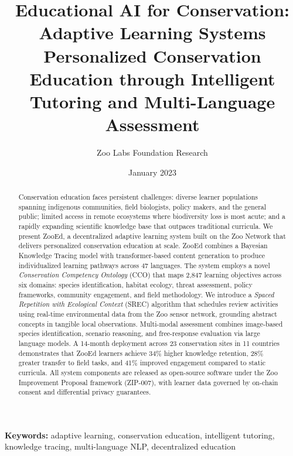 \documentclass[11pt,a4paper]{article}
\title{\textbf{Educational AI for Conservation: Adaptive Learning Systems} \\[0.5em]
\large Personalized Conservation Education through Intelligent Tutoring and Multi-Language Assessment}
\author[1]{Zoo Labs Foundation Research}
\affil[1]{Zoo Labs Foundation Research, Research Division \\ \texttt{research@zoo.ngo}}
\date{January 2023}
\begin{document}
\zoocoverpage

\begin{abstract}
\noindent
Conservation education faces persistent challenges: diverse learner populations spanning indigenous communities, field biologists, policy makers, and the general public; limited access in remote ecosystems where biodiversity loss is most acute; and a rapidly expanding scientific knowledge base that outpaces traditional curricula.
We present ZooEd, a decentralized adaptive learning system built on the Zoo Network that delivers personalized conservation education at scale.
ZooEd combines a Bayesian Knowledge Tracing model with transformer-based content generation to produce individualized learning pathways across 47 languages.
The system employs a novel \emph{Conservation Competency Ontology} (CCO) that maps 2,847 learning objectives across six domains: species identification, habitat ecology, threat assessment, policy frameworks, community engagement, and field methodology.
We introduce a \emph{Spaced Repetition with Ecological Context} (SREC) algorithm that schedules review activities using real-time environmental data from the Zoo sensor network, grounding abstract concepts in tangible local observations.
Multi-modal assessment combines image-based species identification, scenario reasoning, and free-response evaluation via large language models.
A 14-month deployment across 23 conservation sites in 11 countries demonstrates that ZooEd learners achieve 34\% higher knowledge retention, 28\% greater transfer to field tasks, and 41\% improved engagement compared to static curricula.
All system components are released as open-source software under the Zoo Improvement Proposal framework (ZIP-007), with learner data governed by on-chain consent and differential privacy guarantees.
\end{abstract}

\vspace{0.5em}
\noindent\textbf{Keywords:} adaptive learning, conservation education, intelligent tutoring, knowledge tracing, multi-language NLP, decentralized education












\end{document}

